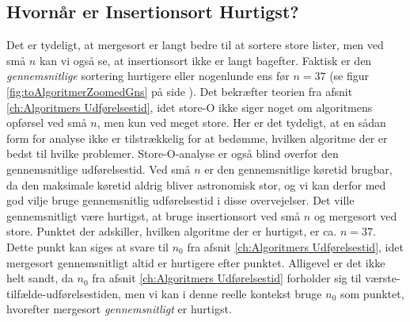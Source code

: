 \subsection{Hvornår er Insertionsort Hurtigst?}%
\label{sub:Store-O er Værste Tilfælde}
Det er tydeligt, at mergesort er langt bedre til at sortere store lister, men ved små $n$ kan vi også se, at insertionsort ikke er langt bagefter. Faktisk er den \emph{gennemsnitlige} sortering hurtigere eller nogenlunde ens før $n = 37$ (se figur \ref{fig:toAlgoritmerZoomedGns} på side \pageref{fig:toAlgoritmerZoomedGns}). Det bekræfter teorien fra afsnit \ref{ch:Algoritmers Udførelsestid}, idet store-O ikke siger noget om algoritmens opførsel ved små $n$, men kun ved meget store. Her er det tydeligt, at en sådan form for analyse ikke er tilstrækkelig for at bedømme, hvilken algoritme der er bedst til hvilke problemer. Store-O-analyse er også blind overfor den gennemsnitlige udførelsestid. Ved små $n$ er den gennemsnitlige køretid brugbar, da den maksimale køretid aldrig bliver astronomisk stor, og vi kan derfor med god vilje bruge gennemsnitlig udførelsestid i disse overvejelser. Det ville gennemsnitligt være hurtigst, at bruge insertionsort ved små $n$ og mergesort ved store. Punktet der adskiller, hvilken algoritme der er hurtigst, er ca. $n = 37$. Dette punkt kan siges at svare til $n_0$ fra afsnit \ref{ch:Algoritmers Udførelsestid}, idet mergesort gennemsnitligt altid er hurtigere efter punktet. Alligevel er det ikke helt sandt, da $n_0$ fra afsnit \ref{ch:Algoritmers Udførelsestid} forholder sig til værste-tilfælde-udførelsestiden, men vi kan i denne reelle kontekst bruge $n_0$ som punktet, hvorefter mergesort \emph{gennemsnitligt} er hurtigst.






